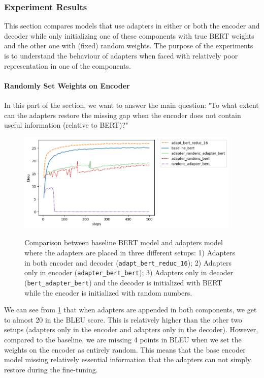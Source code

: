 \subsubsection{Experiment Results}
This section compares models that use adapters in either or both the encoder and decoder while only initializing one of these components with true BERT weights and the other one with (fixed) random weights. The purpose of the experiments is to understand the behaviour of adapters when faced with relatively poor representation in one of the components.

\paragraph{Randomly Set Weights on Encoder}
In this part of the section, we want to answer the main question: "To what extent can the adapters restore the missing gap when the encoder does not contain useful information (relative to BERT)?"

\begin{figure}[h]
    {\includegraphics[width=0.95\textwidth]{img/adapter_bert_randenc.png}}
    \centering
    \caption[Comparison for model with adapters in the decoder and the encoder is initalized with random weights.]{Comparison between baseline BERT model and adapters model where the adapters are placed in three different setups: 1) Adapters in both encoder and decoder (\texttt{adapt\_bert\_reduc\_16}); 2) Adapters only in encoder (\texttt{adapter\_bert\_bert}); 3) Adapters only in decoder (\texttt{bert\_adapter\_bert}) and the decoder is initialized with BERT while the encoder is initialized with random numbers.}
    \label{img:adapt_bert_randenc}
\end{figure}

We can see from \cref{img:adapt_bert_randenc} that when adapters are appended in both components, we get to almost 20 in the BLEU score. This is relatively higher than the other two setups (adapters only in the encoder and adapters only in the decoder). However, compared to the baseline, we are missing 4 points in BLEU when we set the weights on the encoder as entirely random. This means that the base encoder model missing relatively essential information that the adapters can not simply restore during the fine-tuning.

